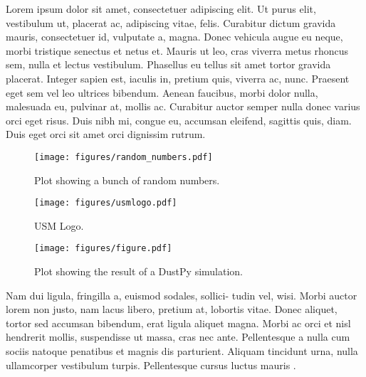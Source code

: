\documentclass{aa}
\begin{document}
Lorem ipsum dolor sit amet, consectetuer adipiscing elit.
Ut purus elit, vestibulum ut, placerat ac, adipiscing vitae, felis.
Curabitur dictum gravida mauris, consectetuer id, vulputate a, magna.
Donec vehicula augue eu neque, morbi tristique senectus et netus et.
Mauris ut leo, cras viverra metus rhoncus sem, nulla et lectus vestibulum.
Phasellus eu tellus sit amet tortor gravida placerat.
Integer sapien est, iaculis in, pretium quis, viverra ac, nunc.
Praesent eget sem vel leo ultrices bibendum.
Aenean faucibus, morbi dolor nulla, malesuada eu, pulvinar at, mollis ac.
Curabitur auctor semper nulla donec varius orci eget risus.
Duis nibh mi, congue eu, accumsan eleifend, sagittis quis, diam.
Duis eget orci sit amet orci dignissim rutrum.

\begin{figure}
    \begin{centering}
        \texttt{[image: figures/random\_numbers.pdf]}
        \caption{
            Plot showing a bunch of random numbers.
        }
        \label{fig:random_numbers}
    \end{centering}
\end{figure}

\begin{figure}
    \begin{centering}
        \texttt{[image: figures/usmlogo.pdf]}
        \caption{
            USM Logo.
        }
        \label{fig:usm_logo}
    \end{centering}
\end{figure}

\begin{figure}
    \begin{centering}
        \texttt{[image: figures/figure.pdf]}
        \caption{
            Plot showing the result of a DustPy simulation.
        }
        \label{fig:simulation_dustpy}
    \end{centering}
\end{figure}

Nam dui ligula, fringilla a, euismod sodales, sollici- tudin vel, wisi.
Morbi auctor lorem non justo, nam lacus libero, pretium at, lobortis vitae.
Donec aliquet, tortor sed accumsan bibendum, erat ligula aliquet magna.
Morbi ac orci et nisl hendrerit mollis, suspendisse ut massa, cras nec ante.
Pellentesque a nulla cum sociis natoque penatibus et magnis dis parturient.
Aliquam tincidunt urna, nulla ullamcorper vestibulum turpis.
Pellentesque cursus luctus mauris \citep{Luger2021}.


\end{document}
